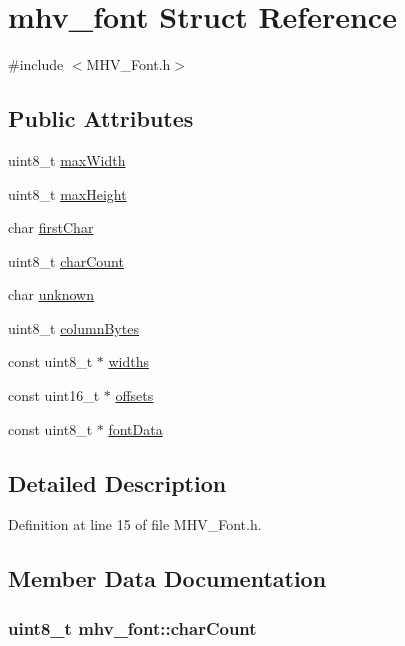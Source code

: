 \hypertarget{structmhv__font}{
\section{mhv\-\_\-font \-Struct \-Reference}
\label{structmhv__font}
}


{\ttfamily \#include $<$\-M\-H\-V\-\_\-\-Font.\-h$>$}

\subsection*{\-Public \-Attributes}
\begin{DoxyCompactItemize}
\item 
uint8\-\_\-t \hyperlink{structmhv__font_a21edb005a94690dc33615312f21640d0}{max\-Width}
\item 
uint8\-\_\-t \hyperlink{structmhv__font_aa15b52666692c10a27f9b5fcbed78780}{max\-Height}
\item 
char \hyperlink{structmhv__font_a675ce1bde33e6b62a4aff2ba955e61c7}{first\-Char}
\item 
uint8\-\_\-t \hyperlink{structmhv__font_a94db16004d6b4d91da0baf4d16c1952a}{char\-Count}
\item 
char \hyperlink{structmhv__font_a2df18aa9aae6fbbd346b07084eb7f5af}{unknown}
\item 
uint8\-\_\-t \hyperlink{structmhv__font_aee0716d7afae1a161ddab7859aebeb6b}{column\-Bytes}
\item 
const uint8\-\_\-t $\ast$ \hyperlink{structmhv__font_a27b1d6f8273b5c47331c56dc2fa99d39}{widths}
\item 
const uint16\-\_\-t $\ast$ \hyperlink{structmhv__font_abf40bd8aecc79834ae9a010a25de1ecd}{offsets}
\item 
const uint8\-\_\-t $\ast$ \hyperlink{structmhv__font_a2143c1f24a538699b21c26a0e848061e}{font\-Data}
\end{DoxyCompactItemize}


\subsection{\-Detailed \-Description}


\-Definition at line 15 of file \-M\-H\-V\-\_\-\-Font.\-h.



\subsection{\-Member \-Data \-Documentation}
\hypertarget{structmhv__font_a94db16004d6b4d91da0baf4d16c1952a}{
\subsubsection[{char\-Count}]{\setlength{\rightskip}{0pt plus 5cm}uint8\-\_\-t {\bf mhv\-\_\-font\-::char\-Count}}}
\label{structmhv__font_a94db16004d6b4d91da0baf4d16c1952a}


